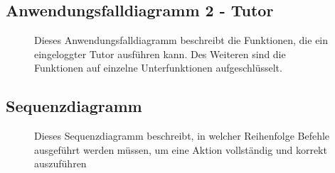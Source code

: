 \documentclass[10pt,a4paper]{scrartcl}
\begin{document}
\subsection{Anwendungsfalldiagramm 2 - Tutor}
\begin{figure}[!htbp]
 \caption{Dieses Anwendungsfalldiagramm beschreibt die Funktionen, die ein eingeloggter Tutor ausführen kann. Des Weiteren sind die Funktionen auf einzelne Unterfunktionen aufgeschlüsselt.}
\end{figure}
\newpage
\subsection{Sequenzdiagramm}
\begin{figure}[!htbp]
\caption{Dieses Sequenzdiagramm beschreibt, in welcher Reihenfolge Befehle ausgeführt werden müssen, um eine Aktion vollständig und korrekt auszuführen}
\end{figure}
\newpage
\end{document}
